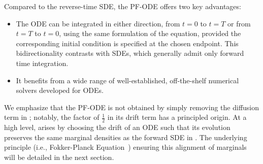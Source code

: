 Compared to the reverse-time SDE, the PF-ODE offers two key advantages:
\begin{itemize}
    \item The ODE can be integrated in either direction, from $t=0$ to $t=T$ or from $t=T$ to $t=0$, using the same formulation of the equation, provided the corresponding initial condition is specified at the chosen endpoint. This bidirectionality contrasts with SDEs, which generally admit only forward time integration.
    \item It benefits from a wide range of well-established, off-the-shelf numerical solvers developed for ODEs.
\end{itemize}


We emphasize that the PF-ODE is not obtained by simply removing the diffusion term in ; notably, the factor of $\frac{1}{2}$ in its drift term has a principled origin. At a high level,  arises by choosing the drift of an ODE such that its evolution preserves the same marginal densities as the forward SDE in . The underlying principle (i.e., Fokker-Planck Equation~\citep{oksendal2003stochastic}) ensuring this alignment of marginals will be detailed in the next section.


\clearpage
\newpage



